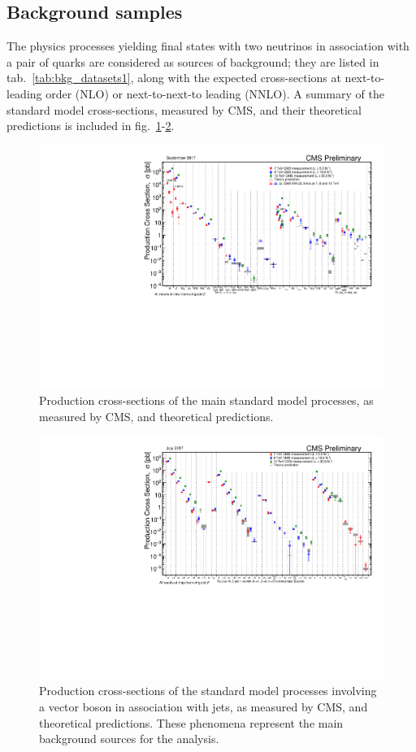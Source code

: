 \subsection{Background samples}\label{ssec:backgrounds}

The physics processes yielding final states with two neutrinos in association with a pair of quarks are considered as sources of background; they are listed in tab.~\ref{tab:bkg_datasets1}, along with the expected cross-sections at next-to-leading order (NLO) or next-to-next-to leading (NNLO). A summary of the standard model cross-sections, measured by CMS, and their theoretical predictions is included in fig.~\ref{fig:sm_xsec}-\ref{fig:dibjet_xsec}.

\begin{figure}[!htb]
 \centering
   \includegraphics[width=.95\textwidth]{figures/SigmaNew_v0.pdf}
 \caption{Production cross-sections of the main standard model processes, as measured by CMS, and theoretical predictions.}
 \label{fig:sm_xsec}
\end{figure}

\begin{figure}[!htb]
 \centering
   \includegraphics[width=.95\textwidth]{figures/SigmaNew_v3.pdf}
 \caption{Production cross-sections of the standard model processes involving a vector boson in association with jets, as measured by CMS, and theoretical predictions. These phenomena represent the main background sources for the analysis.}
 \label{fig:dibjet_xsec}
\end{figure}

